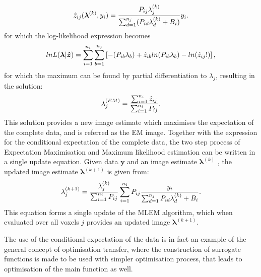 \begin{equation}
\hat{z}_{ij}(\bm{\lambda}^{(k)},y_i) = 
\frac{P_{ij} \lambda_j^{(k)}}{\sum_{d=1}^{n_j} (P_{id}\lambda_d^{(k)} + B_i)}y_i\\.
\end{equation}
for which the log-likelihood expression becomes
\begin{equation}
lnL(\bm{\lambda}|\bm{\hat{z}})  =
\sum_{i=1}^{n_i} \sum_{b=1}^{n_j} \left[ -(P_{ib} \lambda_b) + \hat{z}_{ib} ln( P_{ib} \lambda_b ) - ln(\hat{z}_{ij}!) \right] \\,
\label{eqn:log_likelihood_z}
\end{equation}
for which the maximum can be found by partial differentiation to $\lambda_j$, resulting in the solution:
\begin{equation}
\lambda_j^{(EM)} = \frac{\sum_{i=1}^{n_i} \hat{z}_{ij} }{\sum_{i=1}^{n_i} P_{ij} } \\.
\label{eqn:EMupdate}
\end{equation}
This solution provides a new image estimate which maximises the expectation of the complete data, and is referred as the EM image. 
Together with the expression for the conditional expectation of the complete data, the two step process of Expectation Maximisation and  Maximum likelihood estimation can be written in a single update equation. Given data $\bm{y}$ and an image estimate $\bm{\lambda}^{(k)}$ , the updated image estimate $\bm{\lambda}^{(k+1)}$ is given from:
\begin{equation}
\lambda_j^{(k+1)} = \frac{\lambda_j^{(k)}}{\sum_{i=1}^{n_i} P_{ij}} 
\sum_{i=1}^{n_i} P_{ij} 
\frac{y_i}{\sum_{d=1}^{n_j} P_{id}\lambda_d^{(k)} + B_i } \\.
\label{eqn:MLEM}
\end{equation} 
This equation forms a single update of the MLEM algorithm, which when evaluated over all voxels $j$ provides an updated image $\bm{\lambda}^{(k+1)}$. 

The use of the conditional expectation of the data is in fact an example of the general concept of optimisation transfer, where the construction of surrogate functions is made to be used with simpler optimisation process, that leads to optimisation of the main function as well.

